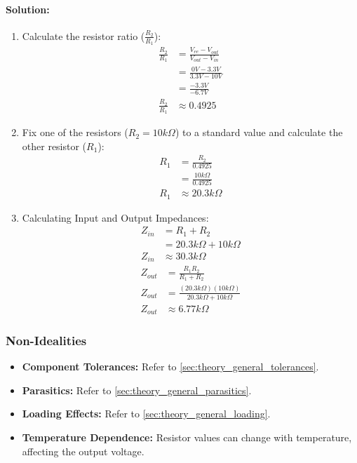 \paragraph{Solution:}
\begin{enumerate}
  \item Calculate the resistor ratio (\(\frac{R_2}{R_1}\)):
    \begin{align*}
      \frac{R_2}{R_1} &= \frac{V_{ee} - V_{out}}{V_{out} - V_{in}} \\
      &= \frac{0V - 3.3V}{3.3V - 10V} \\
      &= \frac{-3.3V}{-6.7V} \\
    \frac{R_2}{R_1} &\approx 0.4925
    \end{align*}
  \item Fix one of the resistors (\(R_2 = 10 k\Omega\)) to a standard
    value and calculate the other resistor (\(R_1\)):
    \begin{align*}
      R_1 &= \frac{R_2}{0.4925} \\
      &= \frac{10 k\Omega}{0.4925} \\
      R_1 &\approx 20.3 k\Omega
    \end{align*}
  \item Calculating Input and Output Impedances:
    \[
        \begin{aligned}
        Z_{in} &= R_1 + R_2 \\
        &= 20.3 k\Omega + 10 k\Omega \\
        Z_{in} &\approx 30.3 k\Omega
        \end{aligned}
      \]
      \[
        \begin{aligned}
          Z_{out} &= \frac{R_1 R_2}{R_1 + R_2} \\
          Z_{out} &= \frac{(20.3 k\Omega)(10 k\Omega)}{20.3 k\Omega + 10 k\Omega} \\
          Z_{out} &\approx 6.77 k\Omega
        \end{aligned}
      \]
\end{enumerate}

\subsubsection{Non-Idealities}
\begin{itemize}
  \item \textbf{Component Tolerances:} Refer to \ref{sec:theory_general_tolerances}.
  \item \textbf{Parasitics:} Refer to \ref{sec:theory_general_parasitics}.
  \item \textbf{Loading Effects:} Refer to \ref{sec:theory_general_loading}.
  \item \textbf{Temperature Dependence:} Resistor values can change with temperature,
    affecting the output voltage.
\end{itemize}
